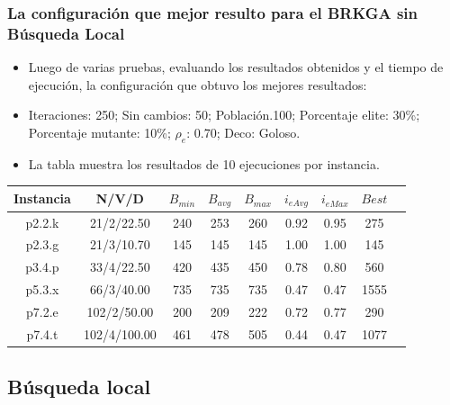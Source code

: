 \documentclass{beamer}
\begin{document}
\begin{frame}
\frametitle{La configuración que mejor resulto para el BRKGA sin Búsqueda Local}

\begin{itemize}
    \item Luego de varias pruebas, evaluando los resultados obtenidos y el tiempo de ejecución, la configuración que obtuvo los mejores resultados:
    \pause
    \item Iteraciones: 250; Sin cambios: 50; Población.100; Porcentaje elite: 30\%; Porcentaje mutante: 10\%; $\rho_e$: 0.70; Deco: Goloso.
    \pause
    \item La tabla muestra los resultados de 10 ejecuciones por instancia.
\end{itemize}

\begin{table}
\begin{center}
\begin{tabular}{ |c|c|c|c|c|c|c|c|c| } 
\hline
Instancia & N/V/D& $B_{min}$ & $B_{avg}$ & $B_{max}$ & $i_{eAvg}$ & $i_{eMax}$ & $Best$ \\
\hline
p2.2.k & 21/2/22.50 & 240 & 253 & 260 & 0.92 & 0.95 & 275 \\
p2.3.g & 21/3/10.70 & 145 & 145 & 145 & 1.00 & 1.00 & 145 \\
p3.4.p & 33/4/22.50 & 420 & 435 & 450 & 0.78 & 0.80 & 560 \\
p5.3.x & 66/3/40.00 & 735 & 735 & 735 & 0.47 & 0.47 & 1555 \\
p7.2.e & 102/2/50.00 & 200 & 209 & 222 & 0.72 & 0.77 & 290 \\
p7.4.t & 102/4/100.00 & 461 & 478 & 505 & 0.44 & 0.47 & 1077 \\
\hline
\end{tabular}
\end{center}
\label{tab:resultadosBrkgaSinBL}
\end{table}

\end{frame}


\subsection{Búsqueda local}
\end{document}
